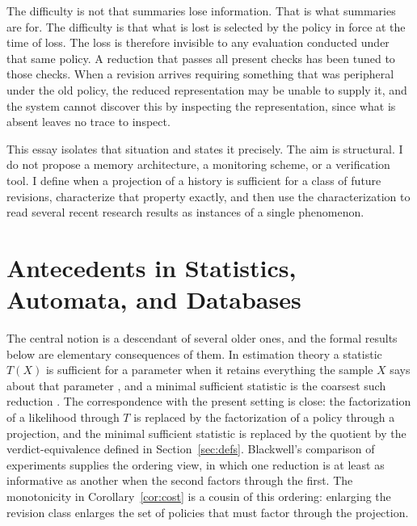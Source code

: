 \documentclass[11pt]{article}
\theoremstyle{remark}
\begin{document}
The difficulty is not that summaries lose information. That is what summaries are for. The difficulty is that what is lost is selected by the policy in force at the time of loss. The loss is therefore invisible to any evaluation conducted under that same policy. A reduction that passes all present checks has been tuned to those checks. When a revision arrives requiring something that was peripheral under the old policy, the reduced representation may be unable to supply it, and the system cannot discover this by inspecting the representation, since what is absent leaves no trace to inspect.

This essay isolates that situation and states it precisely. The aim is structural. I do not propose a memory architecture, a monitoring scheme, or a verification tool. I define when a projection of a history is sufficient for a class of future revisions, characterize that property exactly, and then use the characterization to read several recent research results as instances of a single phenomenon.

\section{Antecedents in Statistics, Automata, and Databases}

The central notion is a descendant of several older ones, and the formal results below are elementary consequences of them. In estimation theory a statistic $T(X)$ is sufficient for a parameter when it retains everything the sample $X$ says about that parameter \cite{fisher1922,halmos1949}, and a minimal sufficient statistic is the coarsest such reduction \cite{lehmann1950}. The correspondence with the present setting is close: the factorization of a likelihood through $T$ is replaced by the factorization of a policy through a projection, and the minimal sufficient statistic is replaced by the quotient by the verdict-equivalence defined in Section~\ref{sec:defs}. Blackwell's comparison of experiments \cite{blackwell1953} supplies the ordering view, in which one reduction is at least as informative as another when the second factors through the first. The monotonicity in Corollary~\ref{cor:cost} is a cousin of this ordering: enlarging the revision class enlarges the set of policies that must factor through the projection.
\end{document}
